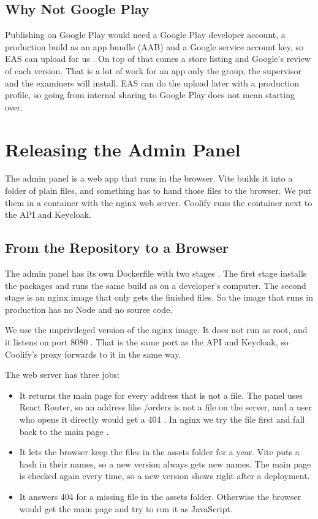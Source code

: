 \documentclass[a4paper,11pt]{article}
\begin{document}
\subsection{Why Not Google Play}
Publishing on Google Play would need a Google Play developer account, a production build as an app bundle (AAB) and a Google service account key, so EAS can upload for us \cite{expo-submit-android}. On top of that comes a store listing and Google's review of each version. That is a lot of work for an app only the group, the supervisor and the examiners will install. EAS can do the upload later with a production profile, so going from internal sharing to Google Play does not mean starting over.

\section{Releasing the Admin Panel}\label{sec:admin-panel}
The admin panel is a web app that runs in the browser. Vite builds it into a folder of plain files, and something has to hand those files to the browser. We put them in a container with the nginx web server. Coolify runs the container next to the API and Keycloak.

\subsection{From the Repository to a Browser}
The admin panel has its own Dockerfile with two stages \cite{docker-multi-stage-builds}. The first stage installs the packages and runs the same build as on a developer's computer. The second stage is an nginx image that only gets the finished files. So the image that runs in production has no Node and no source code.

We use the unprivileged version of the nginx image. It does not run as root, and it listens on port 8080 \cite{nginx-docker-unprivileged}. That is the same port as the API and Keycloak, so Coolify's proxy forwards to it in the same way.

The web server has three jobs:
\begin{itemize}
    \item It returns the main page for every address that is not a file. The panel uses React Router, so an address like /orders is not a file on the server, and a user who opens it directly would get a 404 \cite[sec.~13.2.3]{mardan-react-quickly}. In nginx we try the file first and fall back to the main page \cite{nginx-http-core-module}.
    \item It lets the browser keep the files in the assets folder for a year. Vite puts a hash in their names, so a new version always gets new names. The main page is checked again every time, so a new version shows right after a deployment.
    \item It answers 404 for a missing file in the assets folder. Otherwise the browser would get the main page and try to run it as JavaScript.
\end{itemize}
\end{document}
